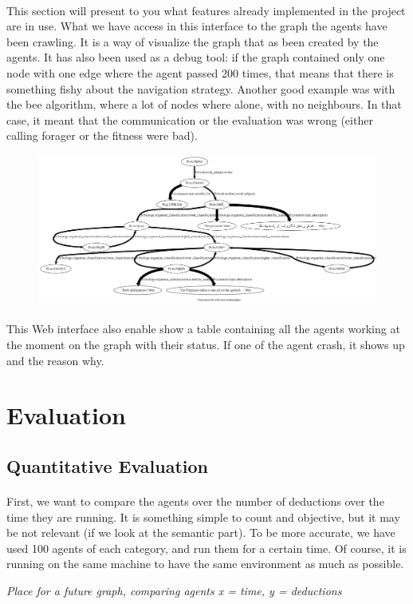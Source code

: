 \documentclass{article}
\begin{document}
		\paragraph{}
			This section will present to you what features already implemented in the project are in use.
			What we have access in this interface to the graph the agents have been crawling.
			It is a way of visualize the graph that as been created by the agents.
			It has also been used as a debug tool: if the graph contained only one node with one edge where the agent passed 200 times,
			that means that there is something fishy about the navigation strategy.
			Another good example was with the bee algorithm, where a lot of nodes where alone, with no neighbours.
			In that case, it meant that the communication or the evaluation was wrong (either calling forager or the fitness were bad).
			\begin{figure}[!h]
				\hspace{-2cm}
				\includegraphics[width=1.4\textwidth]{../dh_graph}
			\end{figure}
			\paragraph{}
				This Web interface also enable show a table containing all the agents working at the moment on the graph with their status.
				If one of the agent crash, it shows up and the reason why.

\section{Evaluation}
	\subsection{Quantitative Evaluation}
		\paragraph{}
			First, we want to compare the agents over the number of deductions over the time they are running.
			It is something simple to count and objective, but it may be not relevant (if we look at the semantic part).
			To be more accurate, we have used 100 agents of each category, and run them for a certain time.
			Of course, it is running on the same machine to have the same environment as much as possible.
		\begin{center}
			\textit{Place for a future graph, comparing agents x = time, y = deductions}
		\end{center}
\end{document}
